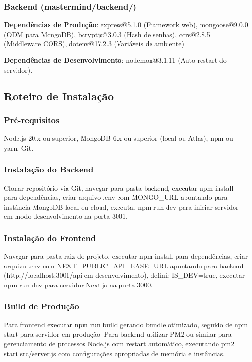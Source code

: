\documentclass[conference]{IEEEtran}
\begin{document}
\subsubsection{Backend (mastermind/backend/)}

\textbf{Dependências de Produção}: express@5.1.0 (Framework web), mongoose@9.0.0 (ODM para MongoDB), bcryptjs@3.0.3 \cite{bcrypt:2024} (Hash de senhas), cors@2.8.5 (Middleware CORS), dotenv@17.2.3 (Variáveis de ambiente).

\textbf{Dependências de Desenvolvimento}: nodemon@3.1.11 (Auto-restart do servidor).

\subsection{Roteiro de Instalação}

\subsubsection{Pré-requisitos}
Node.js 20.x ou superior, MongoDB 6.x ou superior (local ou Atlas), npm ou yarn, Git.

\subsubsection{Instalação do Backend}

Clonar repositório via Git, navegar para pasta backend, executar npm install para dependências, criar arquivo .env com MONGO\_URL apontando para instância MongoDB local ou cloud, executar npm run dev para iniciar servidor em modo desenvolvimento na porta 3001.

\subsubsection{Instalação do Frontend}

Navegar para pasta raiz do projeto, executar npm install para dependências, criar arquivo .env com NEXT\_PUBLIC\_API\_BASE\_URL apontando para backend (http://localhost:3001/api em desenvolvimento), definir IS\_DEV=true, executar npm run dev para servidor Next.js na porta 3000.

\subsubsection{Build de Produção}

Para frontend executar npm run build gerando bundle otimizado, seguido de npm start para servidor em produção. Para backend utilizar PM2 ou similar para gerenciamento de processos Node.js com restart automático, executando pm2 start src/server.js com configurações apropriadas de memória e instâncias.
\end{document}
